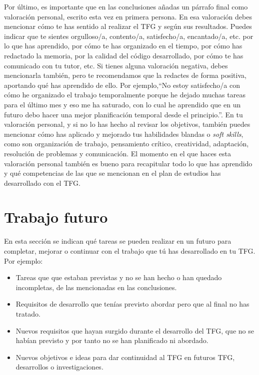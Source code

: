 Por último, es importante que en las conclusiones añadas un párrafo final como valoración personal, escrito esta vez en primera persona. En esa valoración debes mencionar cómo te has sentido al realizar el TFG y según sus resultados. Puedes indicar que te sientes orgulloso/a, contento/a, satisfecho/a, encantado/a, etc. por lo que has aprendido, por cómo te has organizado en el tiempo, por cómo has redactado la memoria, por la calidad del código desarrollado, por cómo te has comunicado con tu tutor, etc. Si tienes alguna valoración negativa, debes mencionarla también, pero te recomendamos que la redactes de forma positiva, aportando qué has aprendido de ello. Por ejemplo,``No estoy satisfecho/a con cómo he organizado el trabajo temporalmente porque he dejado muchas tareas para el último mes y eso me ha saturado, con lo cual he aprendido que en un futuro debo hacer una mejor planificación temporal desde el principio.''. En tu valoración personal, y si no lo has hecho al revisar los objetivos, también puedes mencionar cómo has aplicado y mejorado tus habilidades blandas o \textit{soft skills}, como son organización de trabajo, pensamiento crítico, creatividad, adaptación, resolución de problemas y comunicación. El momento en el que haces esta valoración personal también es bueno para recapitular todo lo que has aprendido y qué competencias de las que se mencionan en el plan de estudios has desarrollado con el TFG.

 \section{Trabajo futuro}

 En esta sección se indican qué tareas se pueden realizar en un futuro para completar, mejorar o continuar con el trabajo que tú has desarrollado en tu TFG. Por ejemplo:
 \begin{itemize}
     \item Tareas que que estaban previstas y no se han hecho o han quedado incompletas, de las mencionadas en las conclusiones.
     \item Requisitos de desarrollo que tenías previsto abordar pero que al final no has tratado.
     \item Nuevos requisitos que hayan surgido durante el desarrollo del TFG, que no se habían previsto y por tanto no se han planificado ni abordado.
     \item Nuevos objetivos e ideas para dar continuidad al TFG en futuros TFG, desarrollos o investigaciones.
 \end{itemize} 

